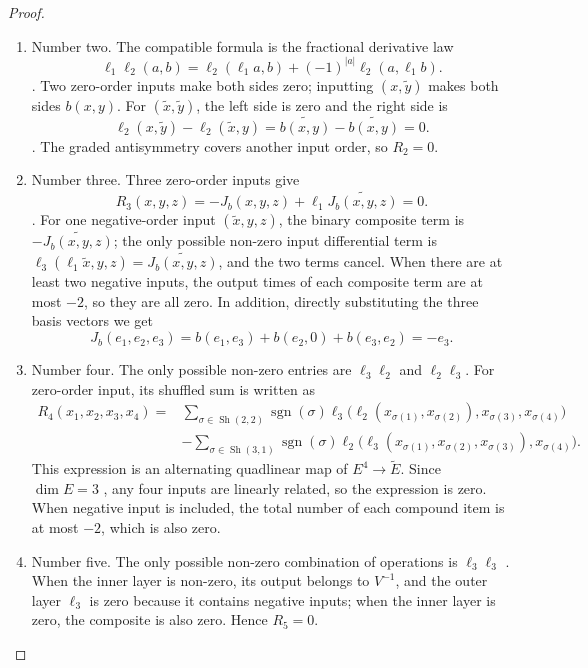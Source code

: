 \documentclass[12pt,a4paper,openany,notitlepage]{report}
\theoremstyle{plain}
\theoremstyle{definition}
\theoremstyle{remark}
\def\mathcal#1{#1}\def\mathsf#1{#1}\def\mathbb#1{#1}%
\begin{document}
\begin{CJK*}
\begin{proof}
\begin{enumerate}
\item
Number two. The compatible formula is the fractional derivative law \[
\ell_1\ell_2(a,b)
=\ell_2(\ell_1a,b)+(-1)^{|a|}\ell_2(a,\ell_1b).
\]. Two zero-order inputs make both sides zero; inputting $(x,\widetilde y)$ makes both sides $b(x,y)$. For $(\widetilde x,\widetilde y)$, the left side is zero and the right side is \[
\ell_2(x,\widetilde y)-\ell_2(\widetilde x,y)
=\widetilde{b(x,y)}-\widetilde{b(x,y)}=0.
\]. The graded antisymmetry covers another input order, so $\mathcal R_2=0$.

\item
Number three. Three zero-order inputs give \[
\mathcal R_3(x,y,z)=-J_b(x,y,z)+\ell_1\widetilde{J_b(x,y,z)}=0.
\]. For one negative-order input $(\widetilde x,y,z)$, the binary composite term is $-\widetilde{J_b(x,y,z)}$; the only possible non-zero input differential term is $\ell_3(\ell_1\widetilde x,y,z)=\widetilde{J_b(x,y,z)}$, and the two terms cancel. When there are at least two negative inputs, the output times of each composite term are at most $-2$, so they are all zero. In addition, directly substituting the three basis vectors we get \[
J_b(e_1,e_2,e_3)
=b(e_1,e_3)+b(e_2,0)+b(e_3,e_2)=-e_3.
\]

\item
Number four. The only possible non-zero entries are $\ell_3\ell_2$ and $\ell_2\ell_3$. For zero-order input, its shuffled sum is written as \[
\begin{aligned}
\mathcal R_4(x_1,x_2,x_3,x_4)
={}&\sum_{\sigma\in\operatorname{Sh}(2,2)}
\operatorname{sgn}(\sigma)
\ell_3\bigl(\ell_2(x_{\sigma(1)},x_{\sigma(2)}),
x_{\sigma(3)},x_{\sigma(4)}\bigr)\\
&-\sum_{\sigma\in\operatorname{Sh}(3,1)}
\operatorname{sgn}(\sigma)
\ell_2\bigl(\ell_3(x_{\sigma(1)},x_{\sigma(2)},x_{\sigma(3)}),
x_{\sigma(4)}\bigr).
\end{aligned}
\] This expression is an alternating quadlinear map of $E^4\to\widetilde E$. Since $\dim E=3$ , any four inputs are linearly related, so the expression is zero. When negative input is included, the total number of each compound item is at most $-2$, which is also zero.

\item
Number five. The only possible non-zero combination of operations is $\ell_3\ell_3$ . When the inner layer is non-zero, its output belongs to $V^{-1}$, and the outer layer $\ell_3$ is zero because it contains negative inputs; when the inner layer is zero, the composite is also zero. Hence $\mathcal R_5=0$.


\end{enumerate}
\end{proof}
\end{CJK*}
\end{document}
